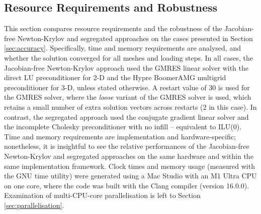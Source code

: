 \documentclass[sn-mathphys,Numbered]{sn-jnl}%
\begin{document}
\subsection{Resource Requirements and Robustness}
\label{sec:resource_requirements}
This section compares resource requirements and the robustness of the Jacobian-free Newton-Krylov and segregated approaches on the cases presented in Section \ref{sec:accuracy}.
Specifically, time and memory requirements are analysed, and whether the solution converged for all meshes and loading steps.
In all cases, the Jacobian-free Newton-Krylov approach used the GMRES linear solver with the direct LU preconditioner for 2-D and the Hypre BoomerAMG multigrid preconditioner for 3-D, unless stated otherwise.
A restart value of 30 is used for the GMRES solver, where the \emph{loose} variant of the GMRES solver is used, which retains a small number of extra solution vectors across restarts (2 in this case).
In contrast, the segregated approach used the conjugate gradient linear solver and the incomplete Cholesky preconditioner with no infill -- equivalent to ILU(0).
Time and memory requirements are implementation and hardware-specific; nonetheless, it is insightful to see the relative performances of the Jacobian-free Newton-Krylov and segregated approaches on the same hardware and within the same implementation framework.
Clock times and memory usage (measured with the GNU time utility) were generated using a Mac Studio with an M1 Ultra CPU on one core, where the code was built with the Clang compiler (version 16.0.0).
Examination of multi-CPU-core parallelisation is left to Section \ref{sec:parallelisation}.
\end{document}
